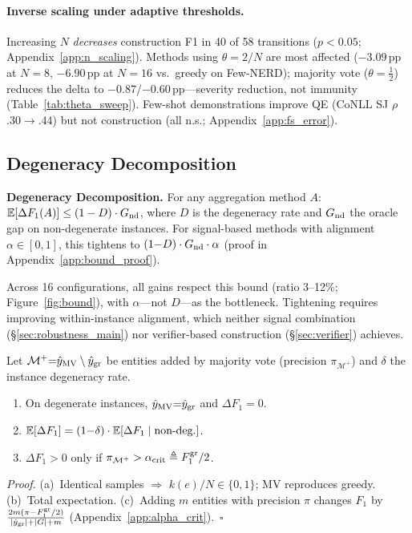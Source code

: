 \paragraph{Inverse scaling under adaptive thresholds.}
Increasing $N$ \textit{decreases} construction F1 in 40 of 58 transitions ($p{<}0.05$; Appendix~\ref{app:n_scaling}).
Methods using $\theta{=}2/N$ are most affected ($-3.09$\,pp at $N{=}8$, $-6.90$\,pp at $N{=}16$ vs.\ greedy on Few-NERD); majority vote ($\theta{=}\tfrac{1}{2}$) reduces the delta to $-0.87$/$-0.60$\,pp---severity reduction, not immunity (Table~\ref{tab:theta_sweep}).
Few-shot demonstrations improve QE (CoNLL SJ $\rho$ $.30{\to}.44$) but not construction (all n.s.; Appendix~\ref{app:fs_error}).

\subsection{Degeneracy Decomposition}\label{sec:theory}

\noindent\textbf{Degeneracy Decomposition.}\label{thm:degeneracy_bound}
For any aggregation method $A$: $\mathbb{E}[\Delta F_1(A)] \leq (1 - D) \cdot G_{\textup{nd}}$,
where $D$ is the degeneracy rate and $G_{\textup{nd}}$ the oracle gap on non-degenerate instances.
For signal-based methods with alignment $\alpha \in [0,1]$, this tightens to $(1{-}D) \cdot G_{\textup{nd}} \cdot \alpha$ (proof in Appendix~\ref{app:bound_proof}).

\noindent Across 16 configurations, all gains respect this bound (ratio 3--12\%; Figure~\ref{fig:bound}), with $\alpha$---not $D$---as the bottleneck.
Tightening requires improving within-instance alignment, which neither signal combination (\S\ref{sec:robustness_main}) nor verifier-based construction (\S\ref{sec:verifier}) achieves.

\begin{proposition}\label{prop:entity_selection_bound}
Let $\mathcal{M}^+ {=} \hat{y}_{\textup{MV}} \setminus \hat{y}_{\textup{gr}}$ be entities added by majority vote (precision $\pi_{\mathcal{M}^+}$) and $\delta$ the instance degeneracy rate.
\begin{enumerate}[label=\textup{(\alph*)},nosep,leftmargin=*]
\item On degenerate instances, $\hat{y}_{\textup{MV}} {=} \hat{y}_{\textup{gr}}$ and $\Delta F_1 {=} 0$.
\item $\mathbb{E}[\Delta F_1] = (1{-}\delta) \cdot \mathbb{E}[\Delta F_1 \mid \textup{non-deg.}]$.
\item $\Delta F_1 > 0$ only if $\pi_{\mathcal{M}^+} > \alpha_{\textup{crit}} \triangleq F_1^{\textup{gr}}/2$.
\end{enumerate}
\end{proposition}
\noindent\textit{Proof.}
(a)~Identical samples $\Rightarrow$ $k(e)/N \in \{0,1\}$; MV reproduces greedy.
(b)~Total expectation.
(c)~Adding $m$ entities with precision $\pi$ changes $F_1$ by $\tfrac{2m(\pi - F_1^{\textup{gr}}/2)}{|\hat{y}_{\textup{gr}}| + |G| + m}$ (Appendix~\ref{app:alpha_crit}).~$\square$

